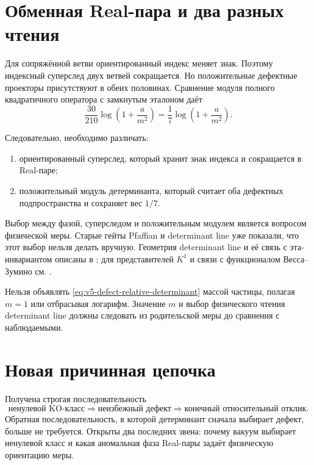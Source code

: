 \section{Обменная Real-пара и два разных чтения}

Для сопряжённой ветви ориентированный индекс меняет знак. Поэтому
индексный суперслед двух ветвей сокращается. Но положительные дефектные
проекторы присутствуют в обеих половинах. Сравнение модуля полного
квадратичного оператора с замкнутым эталоном даёт
\begin{equation}
 \frac{30}{210}
 \log\left(1+\frac{a}{m^2}\right)
 =\frac17\log\left(1+\frac{a}{m^2}\right).
\end{equation}

Следовательно, необходимо различать:
\begin{enumerate}
 \item ориентированный суперслед, который хранит знак индекса и
 сокращается в Real-паре;
 \item положительный модуль детерминанта, который считает оба дефектных
 подпространства и сохраняет вес $1/7$.
\end{enumerate}
Выбор между фазой, суперследом и положительным модулем является вопросом
физической меры. Старые гейты Pfaffian и determinant line уже показали,
что этот выбор нельзя делать вручную. Геометрия determinant line и её
связь с эта-инвариантом описаны в ; для
представителей $K^1$ и связи с функционалом Весса--Зумино см.
.

\begin{nogocriterion}
Нельзя объявлять \eqref{eq:v5-defect-relative-determinant} массой частицы,
полагая $m=1$ или отбрасывая логарифм. Значение $m$ и выбор физического
чтения determinant line должны следовать из родительской меры до
сравнения с наблюдаемыми.
\end{nogocriterion}

\section{Новая причинная цепочка}

Получена строгая последовательность
\begin{equation}
 \text{ненулевой KO-класс}
 \Longrightarrow
 \text{неизбежный дефект}
 \Longrightarrow
 \text{конечный относительный отклик}.
\end{equation}
Обратная последовательность, в которой детерминант сначала выбирает
дефект, больше не требуется. Открыты два последних звена: почему вакуум
выбирает ненулевой класс и какая аномальная фаза Real-пары задаёт
физическую ориентацию меры.

